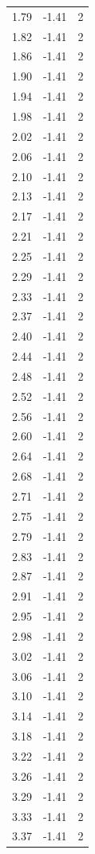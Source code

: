 \begin{longtable}{lrr}
  1.79 & -1.41 & 2 \\
  1.82 & -1.41 & 2 \\
  1.86 & -1.41 & 2 \\
  1.90 & -1.41 & 2 \\
  1.94 & -1.41 & 2 \\
  1.98 & -1.41 & 2 \\
  2.02 & -1.41 & 2 \\
  2.06 & -1.41 & 2 \\
  2.10 & -1.41 & 2 \\
  2.13 & -1.41 & 2 \\
  2.17 & -1.41 & 2 \\
  2.21 & -1.41 & 2 \\
  2.25 & -1.41 & 2 \\
  2.29 & -1.41 & 2 \\
  2.33 & -1.41 & 2 \\
  2.37 & -1.41 & 2 \\
  2.40 & -1.41 & 2 \\
  2.44 & -1.41 & 2 \\
  2.48 & -1.41 & 2 \\
  2.52 & -1.41 & 2 \\
  2.56 & -1.41 & 2 \\
  2.60 & -1.41 & 2 \\
  2.64 & -1.41 & 2 \\
  2.68 & -1.41 & 2 \\
  2.71 & -1.41 & 2 \\
  2.75 & -1.41 & 2 \\
  2.79 & -1.41 & 2 \\
  2.83 & -1.41 & 2 \\
  2.87 & -1.41 & 2 \\
  2.91 & -1.41 & 2 \\
  2.95 & -1.41 & 2 \\
  2.98 & -1.41 & 2 \\
  3.02 & -1.41 & 2 \\
  3.06 & -1.41 & 2 \\
  3.10 & -1.41 & 2 \\
  3.14 & -1.41 & 2 \\
  3.18 & -1.41 & 2 \\
  3.22 & -1.41 & 2 \\
  3.26 & -1.41 & 2 \\
  3.29 & -1.41 & 2 \\
  3.33 & -1.41 & 2 \\
  3.37 & -1.41 & 2 \\

\end{longtable}
